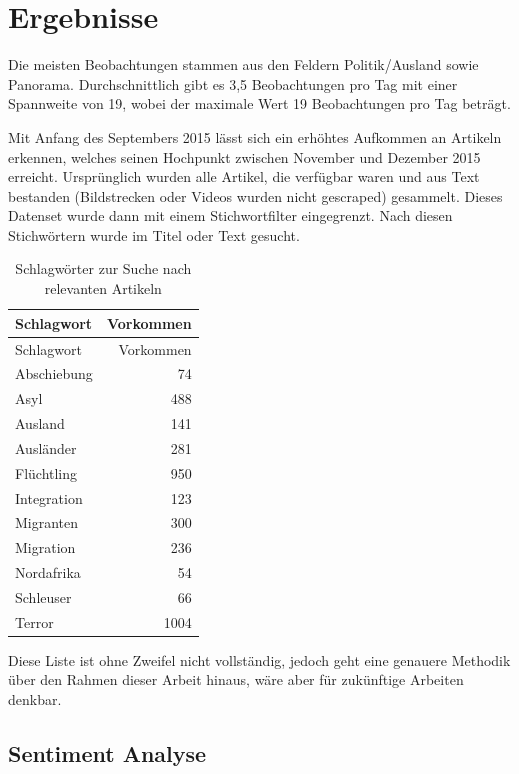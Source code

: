 \documentclass[
  11pt,
]{article}
\begin{document}
\hypertarget{ergebnisse}{%
\section{Ergebnisse}\label{ergebnisse}}

Die meisten Beobachtungen stammen aus den Feldern Politik/Ausland sowie
Panorama. Durchschnittlich gibt es 3,5 Beobachtungen pro Tag mit einer
Spannweite von 19, wobei der maximale Wert 19 Beobachtungen pro Tag
beträgt.

Mit Anfang des Septembers 2015 lässt sich ein erhöhtes Aufkommen an
Artikeln erkennen, welches seinen Hochpunkt zwischen November und
Dezember 2015 erreicht. Ursprünglich wurden alle Artikel, die verfügbar
waren und aus Text bestanden (Bildstrecken oder Videos wurden nicht
gescraped) gesammelt. Dieses Datenset wurde dann mit einem
Stichwortfilter eingegrenzt. Nach diesen Stichwörtern wurde im Titel
oder Text gesucht.

\begin{longtable}[]{@{}lr@{}}
\caption{Schlagwörter zur Suche nach relevanten Artikeln}\tabularnewline
\toprule\noalign{}
Schlagwort & Vorkommen \\
\midrule\noalign{}
\endfirsthead
\toprule\noalign{}
Schlagwort & Vorkommen \\
\midrule\noalign{}
\endhead
\bottomrule\noalign{}
\endlastfoot
Abschiebung & 74 \\
Asyl & 488 \\
Ausland & 141 \\
Ausländer & 281 \\
Flüchtling & 950 \\
Integration & 123 \\
Migranten & 300 \\
Migration & 236 \\
Nordafrika & 54 \\
Schleuser & 66 \\
Terror & 1004 \\
\end{longtable}

Diese Liste ist ohne Zweifel nicht vollständig, jedoch geht eine
genauere Methodik über den Rahmen dieser Arbeit hinaus, wäre aber für
zukünftige Arbeiten denkbar.

\hypertarget{sentiment-analyse-1}{%
\subsection{Sentiment Analyse}\label{sentiment-analyse-1}}
\end{document}
